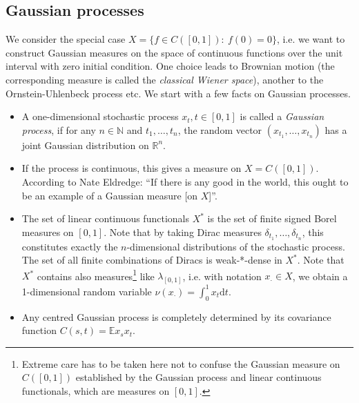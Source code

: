 \documentclass{scrartcl}
\theoremstyle{definition}
\theoremstyle{remark}
\newcommand{\de}{\mathrm d}
\newcommand{\N}{\mathbb N}
\newcommand{\R}{\mathbb R}
\newcommand{\E}{\mathbb E}
\begin{document}
\subsection{Gaussian processes}
We consider the special case $X = \{f \in C([0,1]):~ f(0) = 0\}$, i.e. we want to construct Gaussian measures on the space of continuous functions over the unit interval with zero initial condition. One choice leads to Brownian motion (the corresponding measure is called the \textit{classical Wiener space}), another to the Ornstein-Uhlenbeck process etc. We start with a few facts on Gaussian processes.

\begin{itemize}
\item A one-dimensional stochastic process $x_t, t\in[0,1]$ is called a \textit{Gaussian process}, if for any $n\in \N$ and  $t_1,\ldots, t_n$, the random vector $(x_{t_1},\ldots,x_{t_n})$ has a joint Gaussian distribution on $\R^n$.
\item If the process is continuous, this gives a measure on $X  =C([0,1])$. According to Nate Eldredge: ``If there is any good in the world, this ought to be an example of a Gaussian measure [on $X$]''. 
\item The set of linear continuous functionals $X^*$ is the set of finite signed Borel measures on $[0,1]$. Note that by taking Dirac measures $\delta_{t_1},\ldots,\delta_{t_n}$, this constitutes exactly the $n$-dimensional distributions of the stochastic process. The set of all finite combinations of Diracs is weak-*-dense in $X^*$. Note that $X^*$ contains also measures\footnote{Extreme care has to be taken here not to confuse the Gaussian measure on $C([0,1])$ established by the Gaussian process and linear continuous functionals, which are measures on $[0,1]$.} like $\lambda_{[0,1]}$, i.e. with notation $x_\cdot\in X$, we obtain a 1-dimensional random variable $\nu(x_\cdot) = \int_0^1 x_t \de t$. 
\item Any centred Gaussian process is completely determined by its covariance function $C(s,t) = \E x_s x_t$.
\end{itemize}
\end{document}
